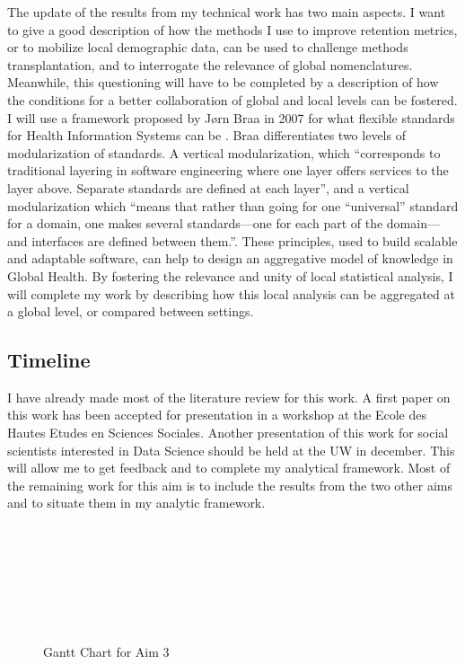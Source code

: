 The update of the results from my technical work has two main aspects. I want to give a good description of how the methods I use to improve retention metrics, or to mobilize local demographic data, can be used to challenge methods transplantation, and to interrogate the relevance of global nomenclatures. Meanwhile, this questioning will have to be completed by a description of how the conditions for a better collaboration of global and local levels can be fostered. I will use a framework proposed by Jørn Braa in 2007 for what flexible standards for Health Information Systems can be \citep{braa_developing_2007}. Braa differentiates two levels of modularization of standards. A vertical modularization, which “corresponds to traditional layering in software engineering where one layer offers services to the layer above. Separate standards are defined at each layer”, and a vertical modularization which “means that rather than going for one “universal” standard for a domain, one makes several standards—one for each part of the domain—and interfaces are defined between them.”. These principles, used to build scalable and adaptable software, can help to design an aggregative model of knowledge in Global Health. By fostering the relevance and unity of local statistical analysis, I will complete my work by describing how this local analysis can be aggregated at a global level, or compared between settings.

\subsection{Timeline}
\label{timeline:aim3}

I have already made most of the literature review for this work. A first paper on this work has been accepted for presentation in a workshop at the Ecole des Hautes Etudes en Sciences Sociales. Another presentation of this work for social scientists interested in Data Science should be held at the UW in december. This will allow me to get feedback and to complete my analytical framework. Most of the remaining work for this aim is to include the results from the two other aims and to situate them in my analytic framework.


\begin{figure}[!t]
	\begin{ganttchart}[vgrid,hgrid,y unit chart=.6cm]{1}{9}
		 \\
		 \\

		 \\
		 \\
		 \\
		 \\
	\end{ganttchart}
	\caption{Gantt Chart for Aim 3}
	\label{GanttPaper3}
\end{figure}
